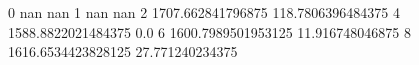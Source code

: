 0 nan nan
1 nan nan
2 1707.662841796875 118.7806396484375
4 1588.8822021484375 0.0
6 1600.7989501953125 11.916748046875
8 1616.6534423828125 27.771240234375
